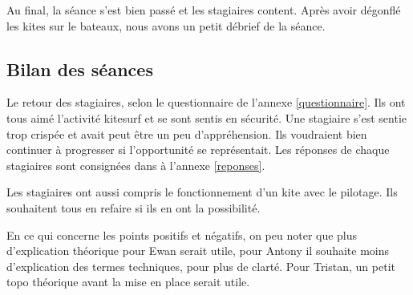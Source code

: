 \documentclass[11pt,a4paper]{report}
\begin{document}
Au final, la séance s'est bien passé et les stagiaires content.
Après avoir dégonflé les kites sur le bateaux, nous avons un petit débrief 
de la séance.



\subsection{Bilan des séances}
Le retour des stagiaires, selon le questionnaire de l'annexe \ref{questionnaire}.
Ils ont tous aimé l'activité kitesurf et se sont sentis en sécurité.
Une stagiaire s'est sentie trop crispée et avait peut \^etre un peu d'appréhension.
Ils  voudraient bien continuer à progresser si l'opportunité se représentait.
Les réponses de chaque stagiaires sont consignées dans à l'annexe \ref{reponses}.

Les stagiaires ont aussi compris le fonctionnement d'un kite avec le pilotage.
Ils souhaitent tous en refaire si ils en ont la possibilité.

En ce qui concerne les points positifs et négatifs, on peu noter
que plus d'explication théorique pour Ewan serait utile, pour Antony
il souhaite moins d'explication des termes techniques, pour plus de clarté.
Pour Tristan, un petit topo théorique avant la mise en place serait utile.
\end{document}

